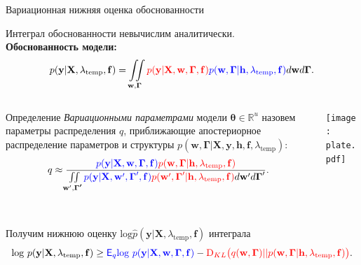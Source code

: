 \documentclass[usenames,dvipsnames,11pt,pdf,utf8,russian,aspectratio=43]{beamer}
\begin{document}
\begin{frame}{Вариационная нижняя оценка обоснованности} 
\footnotesize

Интеграл обоснованности невычислим аналитически.\\
\textbf{Обоснованность модели:}
\[
p(\mathbf{y}|\mathbf{X}, \lambda_\text{temp},\mathbf{f}) =
 \iint\limits_{\mathbf{w}, \boldsymbol{\Gamma}}  \textcolor{red}{p(\mathbf{y}|\mathbf{X},\mathbf{w},  \boldsymbol{\Gamma}, \mathbf{f})} \textcolor{blue}{p(\mathbf{w}, \boldsymbol{\Gamma}|\mathbf{h}, \lambda_\text{temp},\mathbf{f})}d\mathbf{w}d{\boldsymbol{\Gamma}}.                         
\]

\begin{columns}
\begin{column}{0.55\textwidth}
  
\begin{block}{Определение}
\textit{Вариационными параметрами} модели $\boldsymbol{\theta} \in \mathbb{R}^{{u}}$ назовем параметры распределения $q$, приближающие апостериорное распределение параметров и структуры $p(\mathbf{w}, \boldsymbol{\Gamma}|\mathbf{X}, \mathbf{y}, \mathbf{h}, \mathbf{f}, \lambda_\text{temp})$:
\[
    q \approx  \frac{\textcolor{blue}{p(\mathbf{y}|\mathbf{X},\mathbf{w},\boldsymbol{\Gamma}, \mathbf{f})}\textcolor{red}{p(\mathbf{w}, \boldsymbol{\Gamma}|\mathbf{h}, \lambda_\text{temp},\mathbf{f})}}{\iint\limits_{\mathbf{w}', \boldsymbol{\Gamma'}}\textcolor{blue}{p(\mathbf{y}|\mathbf{X},\mathbf{w}',\boldsymbol{\Gamma}',\mathbf{f})}\textcolor{red}{p(\mathbf{w}', \boldsymbol{\Gamma}'|\mathbf{h}, \lambda_\text{temp},\mathbf{f})}d\mathbf{w}'d\boldsymbol{\Gamma}'}.
\]
\end{block} 

\end{column}
\begin{column}{0.45\textwidth}  %
    \begin{center}
     \texttt{[image: plate.pdf]}
     \end{center}
\end{column}
\end{columns}



~\\Получим нижнюю оценку $\text{log}\hat{{p}}(\mathbf{y}|\mathbf{X}, \lambda_\text{temp},\mathbf{f})$ интеграла
$$                                                                                                                                              
        \text{log}~p(\mathbf{y}|\mathbf{X}, \lambda_\text{temp},\mathbf{f}) \geq 
\textcolor{blue}{\mathsf{E}_q \text{log}~{p(\mathbf{y} | \mathbf{X}, \mathbf{w}, \boldsymbol{\Gamma},\mathbf{f})}} - \textcolor{red}{\text{D}_{KL}\bigl(q(\mathbf{w}, \boldsymbol{\Gamma})||p(\mathbf{w}, \boldsymbol{\Gamma}| \mathbf{h}, \lambda_\text{temp},\mathbf{f})\bigr)}.
$$ 




\end{frame}
\end{document}

